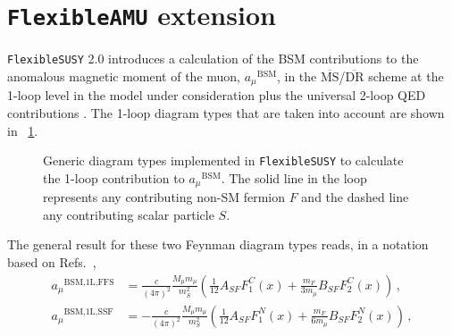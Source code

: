 \documentclass[final,3p,11pt,pdflatex]{elsarticle}
\makeatletter
\newcommand{\fs}{\texttt{FlexibleSUSY}\@\xspace}
\newcommand{\fstwo}{\fs 2.0\@\xspace}
\newcommand{\famu}{\texttt{FlexibleAMU}\@\xspace}
\newcommand{\ol}[1]{\overline{#1}}
\newcommand{\MSbar}{\ensuremath{\ol{\text{MS}}}\xspace}
\newcommand{\DRbar}{\ensuremath{\ol{\text{DR}}}\xspace}
\newcommand{\BSM}{\ensuremath{\text{BSM}}\xspace}
\newcommand{\amu}{\ensuremath{a_\mu}\xspace}
\newcommand{\amuBSM}{\ensuremath{\amu^{\BSM}}\xspace}
\newcommand{\figref}[1]{\figurename~\ref{#1}}
\makeatother
\begin{document}
\section{\famu extension}
\label{sec:famu}

\fstwo introduces a calculation of the BSM contributions to the
anomalous magnetic moment of the muon, \amuBSM, in the \MSbar/\DRbar
scheme at the 1-loop level in the model under consideration plus the
universal 2-loop QED contributions
\cite{Degrassi:1998es,vonWeitershausen:2010zr}.  The 1-loop
diagram types that are taken into account are shown in
\figref{fig:amu_diagram_types}.
%
\begin{figure}[tbh]
  \centering
  \qquad
  \caption{Generic diagram types implemented in \fs to calculate the
    1-loop contribution to $\amuBSM$.  The solid line in the loop
    represents any contributing non-SM fermion $F$ and
    the dashed line any contributing scalar particle $S$.}
  \label{fig:amu_diagram_types}
\end{figure}
%
The general result for these two Feynman diagram types reads, in a
notation based on
Refs.~\cite{Stockinger:2006zn,Martin:2001st,Fargnoli:2013zia},
%
\begin{align}
  \label{eq:amu BSM 1L FFS}
  \amu^{\BSM\text{,1L,FFS}} &=
  \frac{c}{(4\pi)^2} \frac{M_\mu m_\mu}{m_{S}^2}\left(
    \frac{1}{12} A_{SF} F_1^C(x) + \frac{m_F}{3m_\mu} B_{SF} F_2^C(x)
  \right) \,, \\
  \label{eq:amu BSM 1L SSF}
  \amu^{\BSM\text{,1L,SSF}} &=
  - \frac{c}{(4\pi)^2} \frac{M_\mu m_\mu}{m_{S}^2}\left(
    \frac{1}{12} A_{SF} F_1^N(x) + \frac{m_F}{6m_\mu} B_{SF} F_2^N(x)
  \right) \,,
\end{align}
\end{document}
